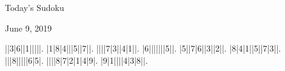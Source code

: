 \documentclass{article}
\begin{document}
\begin{center}
\Huge{Today's Sudoku}
\end{center}
\begin{center}
\Large{June 9, 2019}
\end{center}
\begin{sudoku}
||3|6||1|||||.
|1|8|4|||5||7||.
||||7|3||4|1||.
|6|||||||5||.
|5||7|6||3||2||.
|8|4|1||5||7|3||.
|||8|||||6|5|.
||||8|7|2|1|4|9|.
|9|1||||4|3|8||.
\end{sudoku}
\end{document}
